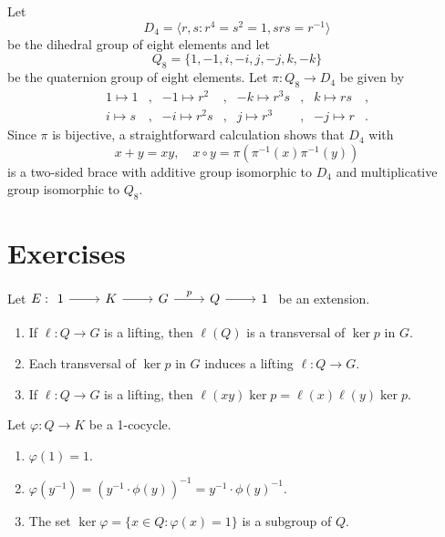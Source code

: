 \begin{example}
	\label{exa:d8q8}
	Let 
	\[
	D_4=\langle r,s:r^4=s^2=1,srs=r^{-1}\rangle
	\]
	be the dihedral group of eight elements and let
	\[
	Q_8=\{1,-1,i,-i,j,-j,k,-k\}
	\]
	be the quaternion group of eight elements.  Let
	$\pi:Q_8\to D_4$ be given by 
	\begin{align*}
		1\mapsto 1 &, & -1\mapsto r^2 &,  & -k\mapsto r^3s &,&  k\mapsto rs &,\\
		i\mapsto s &, & -i\mapsto r^2s &, &  j\mapsto r^3 &, & -j\mapsto r &.
	\end{align*}
	Since $\pi$ is bijective, 
	a straightforward calculation shows that $D_4$ with 
	\[
	  x+y=xy,\quad 
	  x\circ y=\pi(\pi^{-1}(x)\pi^{-1}(y))
	\]
	is a two-sided brace with additive group isomorphic to $D_4$ and multiplicative group
	isomorphic to $Q_8$. 
\end{example}

\section*{Exercises}

\begin{prob}
	\label{xca:lifting}
	Let $E:
	\begin{tikzcd}
	1 & K & G & Q & 1
	\arrow[from=1-1, to=1-2]
	\arrow[from=1-2, to=1-3]
	\arrow["p", from=1-3, to=1-4]
	\arrow[from=1-4, to=1-5]
    \end{tikzcd}$
	be an extension. 
	\begin{enumerate}
		\item If $\ell\colon Q\to G$ is a lifting, then $\ell(Q)$
			is a transversal of $\ker p$ in $G$.
		\item Each transversal of $\ker p$ in $G$ induces a lifting $\ell\colon
			Q\to G$.
		\item If $\ell\colon Q\to G$ is a lifting, then 
			$\ell(xy)\ker p=\ell(x)\ell(y)\ker p$.
	\end{enumerate}
\end{prob}

\begin{prob}
	\label{xca:1cocycle}
	Let $\varphi\colon Q\to K$ be a 1-cocycle. 
	\begin{enumerate}
		\item $\varphi(1)=1$.
		\item $\varphi(y^{-1})=(y^{-1}\cdot\phi(y))^{-1}=y^{-1}\cdot\phi(y)^{-1}$.
		\item The set $\ker\varphi=\{x\in Q:\varphi(x)=1\}$ is a subgroup of $Q$. 
	\end{enumerate}
\end{prob}

